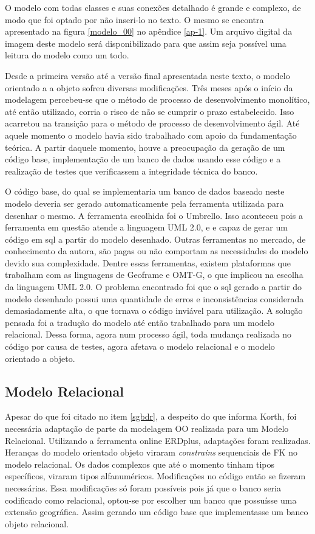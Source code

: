 O modelo com todas classes e suas conexões detalhado é grande e complexo, de modo que foi optado por não inseri-lo no texto. O mesmo se encontra apresentado na figura \ref{modelo_00} no apêndice \ref{ap-1}. Um arquivo digital da imagem deste modelo será disponibilizado para que assim seja possível uma leitura do modelo como um todo.

Desde a primeira versão até a versão final apresentada neste texto, o modelo orientado a a objeto sofreu diversas modificações. Três meses após o início da modelagem percebeu-se que o método de processo de desenvolvimento monolítico, até então utilizado, corria o risco de não se cumprir o prazo estabelecido. Isso acarretou na transição para o método de processo de desenvolvimento ágil. Até aquele momento o modelo havia sido trabalhado com apoio da fundamentação teórica. A partir daquele momento, houve a preocupação da geração de um código base, implementação de um banco de dados usando esse código e a realização de testes que verificassem a integridade técnica do banco. 

O código base, do qual se implementaria um banco de dados baseado neste modelo deveria ser gerado automaticamente pela ferramenta utilizada para desenhar o mesmo. A ferramenta escolhida foi o Umbrello. Isso aconteceu pois a ferramenta em questão atende a linguagem UML 2.0, e e capaz de gerar um código em sql a partir do modelo desenhado. Outras ferramentas no mercado, de conhecimento da autora, são pagas ou não comportam as necessidades do modelo devido sua complexidade. Dentre essas ferramentas, existem plataformas que trabalham com as linguagens de Geoframe e OMT-G, o que implicou na escolha da linguagem UML 2.0. O problema encontrado foi que o sql gerado a partir do modelo desenhado possui uma quantidade de erros e inconsistências considerada demasiadamente alta, o que tornava o código inviável para utilização. A solução pensada foi a tradução do modelo até então trabalhado para um modelo relacional. Dessa forma, agora num processo ágil, toda mudança realizada no código por causa de testes, agora afetava o modelo relacional e o modelo orientado a objeto.


\subsection{Modelo Relacional}

Apesar do que foi citado no item \ref{sgbdr}, a despeito do que informa Korth, foi necessária adaptação de parte da modelagem OO realizada para um Modelo Relacional. Utilizando a ferramenta online ERDplus, adaptações foram realizadas. Heranças do modelo orientado objeto viraram \textit{constrains} sequenciais de FK no modelo relacional. Os dados complexos que até o momento tinham tipos específicos, viraram tipos alfanuméricos. Modificações no código então se fizeram necessárias. Essa modificações só foram possíveis pois já que o banco seria codificado como relacional, optou-se por escolher um banco que possuísse uma extensão geográfica. Assim gerando um código base que implementasse um banco objeto relacional.


